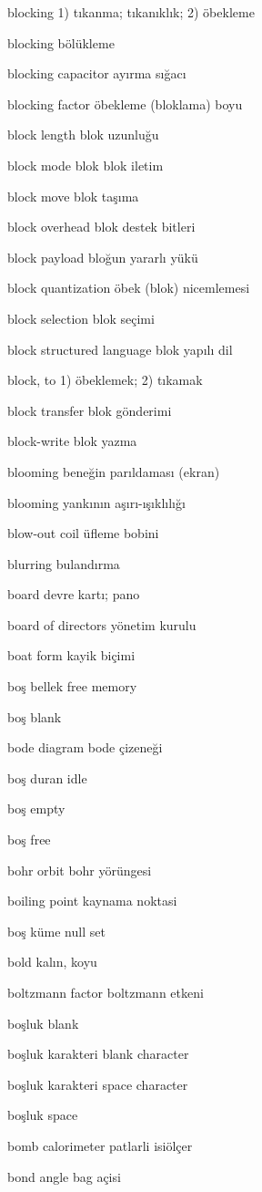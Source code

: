 \documentclass[12pt,fleqn]{article}\usepackage{../../common}
\begin{document}
blocking 1) tıkanma; tıkanıklık; 2) öbekleme

blocking bölükleme

blocking capacitor ayırma sığacı

blocking factor öbekleme (bloklama) boyu

block length blok uzunluğu

block mode blok blok iletim

block move blok taşıma

block overhead blok destek bitleri

block payload bloğun yararlı yükü

block quantization öbek (blok) nicemlemesi

block selection blok seçimi

block structured language blok yapılı dil

block, to 1) öbeklemek; 2) tıkamak

block transfer blok gönderimi

block-write blok yazma

blooming beneğin parıldaması (ekran)

blooming yankının aşırı-ışıklılığı

blow-out coil üfleme bobini

blurring bulandırma

board devre kartı; pano

board of directors yönetim kurulu

boat form kayik biçimi

boş bellek free memory

boş blank

bode diagram bode çizeneği

boş duran idle

boş empty

boş free

bohr orbit bohr yörüngesi

boiling point kaynama noktasi

boş küme null set

bold kalın, koyu

boltzmann factor boltzmann etkeni

boşluk blank

boşluk karakteri blank character

boşluk karakteri space character

boşluk space

bomb calorimeter patlarli isiölçer

bond angle bag açisi
\end{document}
